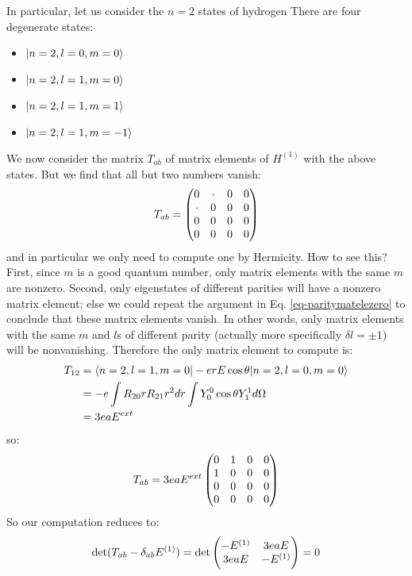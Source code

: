 In particular, let us consider the $n = 2$ states of hydrogen There are four degenerate states:
\begin{itemize}
    \item $\lvert n=2, l=0, m=0 \rangle$
    \item $\lvert n=2, l=1, m=0 \rangle$
    \item $\lvert n=2, l=1, m=1 \rangle$
    \item $\lvert n=2, l=1, m=-1 \rangle$
\end{itemize}
We now consider the matrix $T_{ab}$ of matrix elements of $H^{(1)}$ with the above states. But we find that all but two numbers vanish:
\begin{equation}
    T_{ab} = \begin{pmatrix}0 & \cdot & 0 & 0 \\ \cdot & 0 & 0 & 0 \\ 0 & 0 & 0 & 0 \\ 0 & 0 & 0 & 0\end{pmatrix}
\end{equation}
and in particular we only need to compute one by Hermicity. How to see this? First, since $m$ is a good quantum number, only matrix elements with the same $m$ are nonzero. Second, only eigenstates of different parities will have a nonzero matrix element; else we could repeat the argument in Eq. \eqref{eq-paritymatelezero} to conclude that these matrix elements vanish. In other words, only matrix elements with the same $m$ and $l$s of different parity (actually more specifically $\delta l = \pm 1$) will be nonvanishing. Therefore the only matrix element to compute is:
\begin{equation}
    \begin{split}
        T_{12} &= \langle n=2, l=1, m=0 \rvert-erE\cos\theta \lvert n=2, l=0, m=0 \rangle
        \\ &= -e\int R_{20} r R_{21} r^2 dr \int Y^0_0 \cos\theta Y_1^1 d\Omega
        \\ &= 3eaE^{ext}
    \end{split}
\end{equation}
so:
\begin{equation}
    T_{ab} = 3eaE^{ext}\begin{pmatrix}0 & 1 & 0 & 0 \\ 1 & 0 & 0 & 0 \\ 0 & 0 & 0 & 0 \\ 0 & 0 & 0 & 0\end{pmatrix}
\end{equation}
So our computation reduces to:
\begin{equation}
    \det(T_{ab} - \delta_{ab}E^{(1)}) = \det\begin{pmatrix}-E^{(1)} & 3eaE \\ 3eaE & -E^{(1)}\end{pmatrix} = 0
\end{equation}
